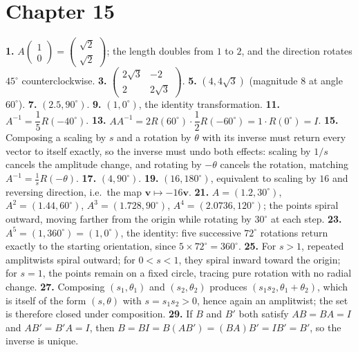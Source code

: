 \section*{Chapter 15}
\textbf{1.} $A\begin{pmatrix}1\\0\end{pmatrix} =
\begin{pmatrix}\sqrt2\\\sqrt2\end{pmatrix}$; the length doubles from $1$
to $2$, and the direction rotates $45^\circ$ counterclockwise. \quad
\textbf{3.} $\begin{pmatrix} 2\sqrt3 & -2 \\ 2 & 2\sqrt3
\end{pmatrix}$. \quad
\textbf{5.} $(4,4\sqrt3)$ (magnitude $8$ at angle $60^\circ$). \quad
\textbf{7.} $(2.5, 90^\circ)$. \quad
\textbf{9.} $(1, 0^\circ)$, the identity transformation. \quad
\textbf{11.} $A^{-1} = \dfrac15 R(-40^\circ)$. \quad
\textbf{13.} $AA^{-1} = 2R(60^\circ)\cdot\dfrac12R(-60^\circ) =
1\cdot R(0^\circ) = I$. \quad
\textbf{15.} Composing a scaling by $s$ and a rotation by $\theta$ with
its inverse must return every vector to itself exactly, so the inverse
must undo both effects: scaling by $1/s$ cancels the amplitude change,
and rotating by $-\theta$ cancels the rotation, matching $A^{-1} =
\frac1s R(-\theta)$. \quad
\textbf{17.} $(4, 90^\circ)$. \quad
\textbf{19.} $(16, 180^\circ)$, equivalent to scaling by $16$ and
reversing direction, i.e.\ the map $\mathbf{v}\mapsto -16\mathbf{v}$.
\quad
\textbf{21.} $A=(1.2,30^\circ)$, $A^2=(1.44,60^\circ)$,
$A^3=(1.728,90^\circ)$, $A^4=(2.0736,120^\circ)$; the points spiral
outward, moving farther from the origin while rotating by $30^\circ$ at
each step. \quad
\textbf{23.} $A^5 = (1,360^\circ) = (1,0^\circ)$, the identity: five
successive $72^\circ$ rotations return exactly to the starting
orientation, since $5\times72^\circ=360^\circ$. \quad
\textbf{25.} For $s>1$, repeated amplitwists spiral outward; for
$0<s<1$, they spiral inward toward the origin; for $s=1$, the points
remain on a fixed circle, tracing pure rotation with no radial change.
\quad
\textbf{27.} Composing $(s_1,\theta_1)$ and $(s_2,\theta_2)$ produces
$(s_1s_2, \theta_1+\theta_2)$, which is itself of the form $(s,\theta)$
with $s=s_1s_2>0$, hence again an amplitwist; the set is therefore
closed under composition. \quad
\textbf{29.} If $B$ and $B'$ both satisfy $AB=BA=I$ and $AB'=B'A=I$,
then $B = BI = B(AB') = (BA)B' = IB' = B'$, so the inverse is unique.
